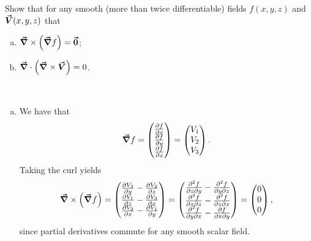 \documentclass[12pt]{article} %
\begin{document}
\newpage
\begin{problem}
Show that for any smooth (more than twice differentiable) fields $f(x,y,z)$ and $\boldsymbol{\vec{V}}(x,y,z)$ that
\begin{enumerate}[(a)]
	\item $\boldsymbol{\vec{\nabla}} \times \left(\boldsymbol{\vec{\nabla}} f\right)=\boldsymbol{\vec{0}}$;
	\item $\boldsymbol{\vec{\nabla}} \cdot \left(\boldsymbol{\vec{\nabla}} \times \boldsymbol{\vec{V}}\right)=0$.
\end{enumerate}
\end{problem}
\begin{solution}~
    \begin{enumerate}[(a)]
        \item We have that 
        \[
        \boldsymbol{\vec{\nabla}} f = \begin{pmatrix} \frac{\partial f}{\partial x} \\ \frac{\partial f}{\partial y} \\ \frac{\partial f}{\partial z}\end{pmatrix} = \begin{pmatrix} V_1 \\ V_2 \\ V_3 \end{pmatrix}.
        \]
        Taking the curl yields
        \[
        \boldsymbol{\vec{\nabla}} \times \left(\boldsymbol{\vec{\nabla}} f\right) = \begin{pmatrix} \frac{\partial V_3}{\partial y} - \frac{\partial V_2}{\partial z} \\ \frac{\partial V_1}{\partial z} - \frac{\partial V_3}{\partial x} \\ \frac{\partial V_2}{\partial x} - \frac{\partial V_1}{\partial y} \end{pmatrix} = 
        \begin{pmatrix} \frac{\partial^2 f}{\partial z\partial y} - \frac{\partial^2 f}{\partial y\partial z} \\ \frac{\partial^2 f}{\partial x\partial z} - \frac{\partial^2 f}{\partial z \partial x} \\ \frac{\partial^2 f}{\partial y\partial x} - \frac{\partial f}{\partial x\partial y} \end{pmatrix}= \begin{pmatrix} 0 \\ 0 \\ 0 \end{pmatrix},
        \]
        since partial derivatives commute for any smooth scalar field.
        

\end{enumerate}
\end{solution}
\end{document}
